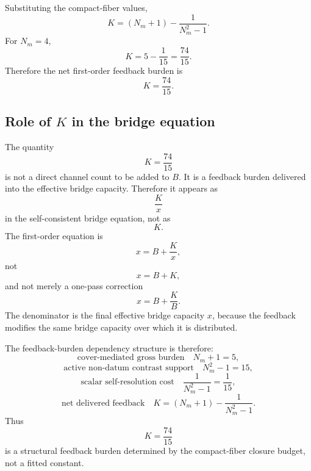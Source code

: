 Substituting the compact-fiber values,
\[
K
=
(N_m+1)
-
\frac1{N_m^2-1}.
\]
For \(N_m=4\),
\[
K
=
5-\frac1{15}
=
\frac{74}{15}.
\]
Therefore the net first-order feedback burden is
\[
\boxed{
K=\frac{74}{15}.
}
\]

\subsection{\texorpdfstring{Role of \(K\) in the bridge equation}{Role of K in the bridge equation}}

The quantity
\[
K=\frac{74}{15}
\]
is not a direct channel count to be added to \(B\). It is a feedback
burden delivered into the effective bridge capacity. Therefore it appears
as
\[
\frac{K}{x}
\]
in the self-consistent bridge equation, not as
\[
K.
\]
The first-order equation is
\[
x=B+\frac{K}{x},
\]
not
\[
x=B+K,
\]
and not merely a one-pass correction
\[
x=B+\frac{K}{B}.
\]
The denominator is the final effective bridge capacity \(x\), because
the feedback modifies the same bridge capacity over which it is
distributed.

The feedback-burden dependency structure is therefore:
\[
\text{cover-mediated gross burden}
\quad
N_m+1=5,
\]
\[
\text{active non-datum contrast support}
\quad
N_m^2-1=15,
\]
\[
\text{scalar self-resolution cost}
\quad
\frac1{N_m^2-1}=\frac1{15},
\]
\[
\text{net delivered feedback}
\quad
K=(N_m+1)-\frac1{N_m^2-1}.
\]
Thus
\[
\boxed{
K=\frac{74}{15}
}
\]
is a structural feedback burden determined by the compact-fiber closure
budget, not a fitted constant.